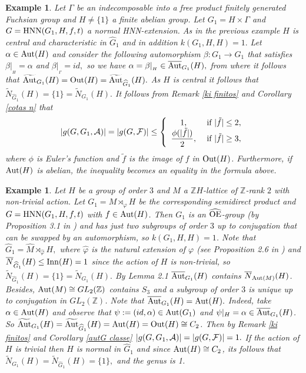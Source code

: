 \documentclass[a4paper,12pt]{article}
\newcommand{\Z}{\mathbb{Z}}
\newcommand{\A}{{\cal A}}
\newcommand{\Oe}{\rm \widehat{OE}}
\def\aut {{\rm Aut}}
\def\out {{\rm Out}}
\def\inn {{\rm Inn}}
\def\hnn {{\rm HNN}}
\def\Z{{\mathbb Z}}
\newtheorem{exa}[thm]{Example}
\begin{document}
{\begin{exa} Let $\Gamma$ be an indecomposable into a free product finitely generated  Fuchsian group and $H \neq \{1\}$ a finite abelian group. Let $G_1=H\times \Gamma$ and $G=\hnn(G_1, H, f,t)$ a normal HNN-extension. As in the previous example  $H$ is central and characteristic in $\widehat{G}_1$ and in addition $k(G_1, H, H)=1.$ Let $\alpha \in \aut(H)$ and consider the following automorphism $\beta:G_1 \longrightarrow G_1$ that satisfies $\beta|_{_{H}}=\alpha$ and $\beta|_{_{ \Gamma}}=id,$ so we have $\alpha = \beta|_{_{H}} \in \overline{\aut}_{G_1}(H),$ from where it follows that $\widetilde{\aut}_{G_1}(H)= \out(H)=\widetilde{\aut}_{\widehat G_1}(H).$ As $H$ is central it follows that $\widetilde{N}_{\widehat{G}_1}(H)=\{1\}=\widetilde{N}_{G_1}(H).$ It follows from Remark \ref{ki finitos} and Corollary \ref{cotas n} that $$|g(G, G_1,\A)|=|g(G, \mathcal{F})| \leq \left\{\begin{array}{cc}
  1,&\mbox{ if } |\tilde f| \leq 2,\\
\displaystyle\frac{\phi(|\tilde f|)}{2}, &\mbox{ if } |\tilde f| \geq 3,
\end{array}\right.$$
where $\phi$ is Euler's function and $\tilde f$ is the image of $f$ in $\out(H)$. Furthermore, if $\aut(H)$ is abelian, the inequality becomes an equality in the formula above.
\end{exa}

\begin{exa}\label{free by Cp} Let $H$ be a group of order $3$ and $M$ a  $\Z H$-lattice of $\Z$-rank $2$ with non-trivial action. Let $G_1=M\rtimes_{\varphi} H$ be the corresponding semidirect product  and $G=\hnn(G_1,H,f,t)$ with $f\in \aut(H)$. Then $G_1$ is an $\Oe$-group (by Proposition 3.1 in \cite{BPZ2}) and has just two subgroups of order $3$ up to conjugation that can be swapped by an automorphism, so $k(G_1,H,H)=1$. 
Note that $\widehat G_1=\widehat M\rtimes_{\hat \varphi} H,$ where $\hat \varphi$ is the natural extension of $\varphi$ (see Proposition 2.6 in \cite{GZ}) and $\overline{N}_{\widehat G_1}(H) \leq \inn(H)=1$ since the action of $H$ is non-trivial, so $\widetilde{N}_{\widehat G_1}(H) = \{1\}=\widetilde{N}_{G_1}(H).$ By Lemma 2.1 \cite{Die}  $\overline{\aut}_{ G_1}(H)$ contains  $\overline N_{\aut(M)}(H)$. Besides, $\aut(M)\cong GL_2(\Z)$ contains $S_3$ and a subgroup of order $3$ is unique up to conjugation in $GL_2(\Z)$. Note that $\overline{\aut}_{G_1}(H)=\aut(H).$ Indeed, take $\alpha\in \aut(H)$ and observe that $\psi:=(id,\alpha) \in \aut(G_1)$ and $\psi|_H=\alpha \in \overline{\aut}_{G_1}(H)$. So $\widetilde{\aut}_{G_1}(H)=\widetilde{\aut}_{\widehat{G}_1}(H)=\aut(H)=\out(H)\cong C_2$. Then by Remark \ref{ki finitos} and Corollary \ref{autG classe} $|g(G,G_1,\A)|=|g(G, \mathcal{F})|=1.$ 
If the action of $H$ is trivial then $H$ is normal in $\widehat{G}_1$ and since $\aut(H) \cong C_2$, its follows that $\widetilde{N}_{G_1}(H)=\widetilde{N}_{\widehat G_1}(H)=\{1\},$  and the genus is 1. 


\end{exa}}
\end{document}
